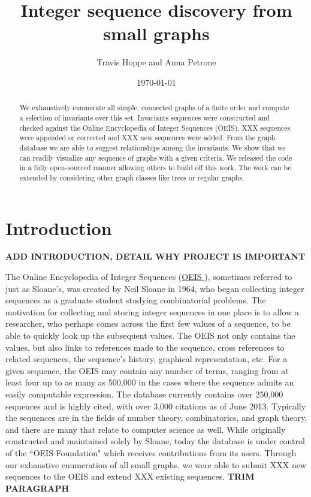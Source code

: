 \documentclass[12pt]{article}
\newcommand{\OEIS}[1]
{\href{https://oeis.org/#1}{OEIS \texttt{#1}}}
\begin{document}
\setlength{\parindent}{0cm}

\title{Integer sequence discovery from small graphs}
\author{Travis Hoppe and Anna Petrone}
\date{\today}
\maketitle

\begin{abstract}
We exhaustively enumerate all simple, connected graphs of a finite order and compute a selection of invariants over this set.
Invariants sequences were constructed and checked against the Online Encyclopedia of Integer Sequences (OEIS).
XXX sequences were appended or corrected and XXX new sequences were added.
From the graph database we are able to suggest relationships among the invariants.
We show that we can readily visualize any sequence of graphs with a given criteria.
We released the code in a fully open-sourced manner allowing others to build off this work.
The work can be extended by considering other graph classes like trees or regular graphs.
\end{abstract}

\section{Introduction}

\textbf{ADD INTRODUCTION, DETAIL WHY PROJECT IS IMPORTANT}

The Online Encyclopedia of Integer Sequences (\OEIS{}), sometimes referred to just as Sloane's, was created by Neil Sloane in 1964, who began collecting integer sequences as a graduate student studying combinatorial problems. 
The motivation for collecting and storing integer sequences in one place is to allow a researcher, who perhaps comes across the first few values of a sequence, to be able to quickly look up the subsequent values. 
The OEIS not only contains the values, but also links to references made to the sequence, cross references to related sequences, the sequence's history, graphical representation, etc. 
For a given sequence, the OEIS may contain any number of terms, ranging from at least four up to as many as 500,000 in the cases where the sequence admits an easily computable expression.
The database currently contains over 250,000 sequences and is highly cited, with over 3,000 citations as of June 2013. 
Typically the sequences are in the fields of number theory, combinatorics, and graph theory, and there are many that relate to computer science as well. 
While originally constructed and maintained solely by Sloane, today the database is under control of the ``OEIS Foundation" which receives contributions from its users. 
Through our exhaustive enumeration of all small graphs, we were able to submit XXX new sequences to the OEIS and extend XXX existing sequences.
\textbf{TRIM PARAGRAPH}
\end{document}

